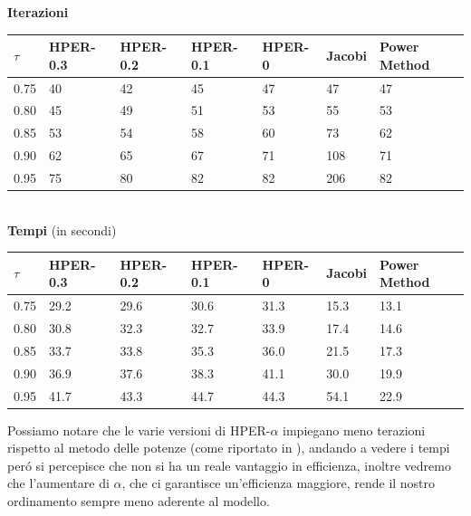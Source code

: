 \documentclass[12pt,a4paper]{amsart}
\numberwithin{equation}{section}
\theoremstyle{plain}
\theoremstyle{definition}
\begin{document}
\begin{center}
\textbf{Iterazioni}\\
    \begin{tabular}{| l | l | l | l | l | l | l |}
\hline
    $\tau$ & HPER-0.3 & HPER-0.2 & HPER-0.1 & HPER-0 & Jacobi & Power Method \\
\hline
   0.75 & 40  &  42 &   45   & 47 &   47  &  47\\
\hline
  0.80 &  45 &   49   & 51 &   53  &  55    &53\\
\hline  
    0.85 & 53    &54    &58&    60&    73&    62\\
\hline
0.90 &    62&    65&    67&    71&   108&    71\\
\hline    
   0.95 & 75&    80&    82&    82&   206&    82\\
    \end{tabular}
\bigskip\\


\textbf{Tempi} (in secondi)
\begin{tabular}{| l | l | l | l | l | l | l |}
\hline
    $\tau$ & HPER-0.3 & HPER-0.2 & HPER-0.1 & HPER-0 & Jacobi & Power Method \\
\hline
   0.75& 29.2&   29.6&   30.6   &31.3   &15.3   &13.1\\
\hline
0.80 & 30.8   &32.3   &32.7   &33.9   &17.4   &14.6\\
\hline
0.85 & 33.7   &33.8   &35.3&   36.0&   21.5&   17.3\\
\hline
0.90 & 36.9   &37.6   &38.3   &41.1   &30.0   &19.9\\
\hline
0.95 & 41.7&   43.3&   44.7&   44.3&   54.1&   22.9\\
    \end{tabular}


\end{center}
\bigskip
Possiamo notare che le varie versioni di HPER-$\alpha$ impiegano meno terazioni rispetto al metodo delle potenze (come riportato in \cite{Tudisco}), andando a vedere i tempi per\'o si percepisce che non si ha un reale vantaggio in efficienza, inoltre vedremo che l'aumentare di $\alpha$, che ci garantisce un'efficienza maggiore, rende il nostro ordinamento sempre meno aderente al modello.
\end{document}
